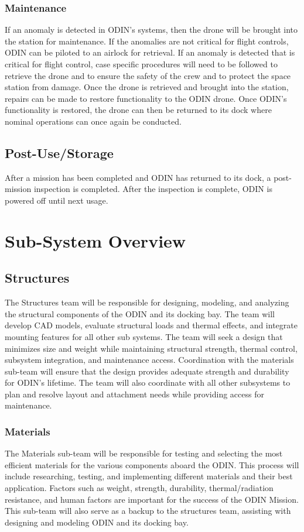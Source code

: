 \documentclass{article}
\begin{document}
\subsubsection{Maintenance}
\label{subsubsec:Maintenance}
If an anomaly is detected in ODIN's systems, then the drone will be brought into the station for maintenance. 
If the anomalies are not critical for flight controls, ODIN can be piloted to an airlock for retrieval. 
If an anomaly is detected that is critical for flight control, case specific procedures will need to be followed to retrieve the drone and to ensure the safety of the crew and to protect the space station from damage. 
Once the drone is retrieved and brought into the station, repairs can be made to restore functionality to the ODIN drone.
Once ODIN's functionality is restored, the drone can then be returned to its dock where nominal operations can once again be conducted.

\subsection{Post-Use/Storage}
After a mission has been completed and ODIN has returned to its dock, a post-mission inspection is completed. 
After the inspection is complete, ODIN is powered off until next usage. 

\newpage
\section{Sub-System Overview}
\subsection{Structures}
The Structures team will be responsible for designing, modeling, and analyzing the structural components of the ODIN and its docking bay. The team will develop CAD models, evaluate structural loads and thermal effects, and integrate mounting features for all other sub systems. The team will seek a design that minimizes size and weight while maintaining structural strength, thermal control, subsystem integration, and maintenance access. Coordination with the materials sub-team will ensure that the design provides adequate strength and durability for ODIN’s lifetime. The team will also coordinate with all other subsystems to plan and resolve layout and attachment needs while providing access for maintenance.  

\subsubsection{Materials}
The Materials sub-team will be responsible for testing and selecting the most efficient materials for the various components aboard the ODIN. This process will include researching, testing, and implementing different materials and their best application. Factors such as weight, strength, durability, thermal/radiation resistance, and human factors are important for the success of the ODIN Mission. This sub-team will also serve as a backup to the structures team, assisting with designing and modeling ODIN and its docking bay. 
\end{document}

